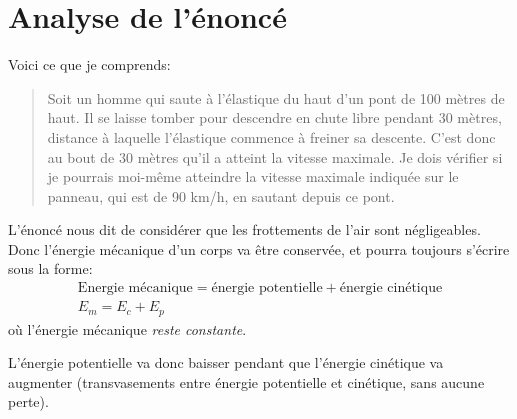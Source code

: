 \section{Analyse de l'énoncé}
Voici ce que je comprends:

\begin{quote}
    Soit un homme qui saute à l'élastique du haut d'un pont de 100 mètres de haut. Il se laisse tomber pour descendre en chute libre pendant 30 mètres, distance à laquelle l'élastique commence à freiner sa descente. C'est donc au bout de 30 mètres qu'il a atteint la vitesse maximale.
    Je dois vérifier si je pourrais moi-même atteindre la vitesse maximale indiquée sur le panneau, qui est de 90 km/h, en sautant depuis ce pont.
\end{quote}

L'énoncé nous dit de considérer que les frottements de l'air sont négligeables. 
Donc l'énergie mécanique d'un corps va être conservée, et pourra toujours s'écrire sous la forme:
\begin{gather*}
    \text{Energie mécanique} = \text{énergie potentielle} + \text{énergie cinétique} \\
    E_m = E_c + E_p
\end{gather*}
où l'énergie mécanique \textit{reste constante}.

L'énergie potentielle va donc baisser pendant que l'énergie cinétique va augmenter (transvasements entre énergie potentielle et cinétique, sans aucune perte).